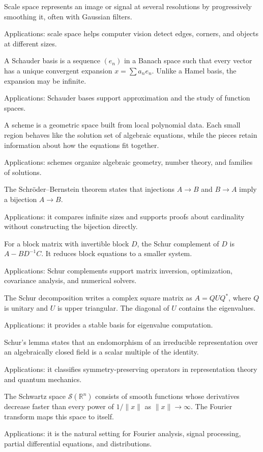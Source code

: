 Scale space represents an image or signal at several resolutions by progressively smoothing it, often with Gaussian filters. \par\noindent Applications: scale space helps computer vision detect edges, corners, and objects at different sizes.

A Schauder basis is a sequence $(e_n)$ in a Banach space such that every vector has a unique convergent expansion $x=\sum a_ne_n$. Unlike a Hamel basis, the expansion may be infinite. \par\noindent Applications: Schauder bases support approximation and the study of function spaces.

A scheme is a geometric space built from local polynomial data. Each small region behaves like the solution set of algebraic equations, while the pieces retain information about how the equations fit together. \par\noindent Applications: schemes organize algebraic geometry, number theory, and families of solutions.

The Schröder--Bernstein theorem states that injections $A\to B$ and $B\to A$ imply a bijection $A\to B$. \par\noindent Applications: it compares infinite sizes and supports proofs about cardinality without constructing the bijection directly.

For a block matrix with invertible block $D$, the Schur complement of $D$ is $A-BD^{-1}C$. It reduces block equations to a smaller system. \par\noindent Applications: Schur complements support matrix inversion, optimization, covariance analysis, and numerical solvers.

The Schur decomposition writes a complex square matrix as $A=QUQ^*$, where $Q$ is unitary and $U$ is upper triangular. The diagonal of $U$ contains the eigenvalues. \par\noindent Applications: it provides a stable basis for eigenvalue computation.

Schur's lemma states that an endomorphism of an irreducible representation over an algebraically closed field is a scalar multiple of the identity. \par\noindent Applications: it classifies symmetry-preserving operators in representation theory and quantum mechanics.

The Schwartz space $\mathcal{S}(\mathbb{R}^n)$ consists of smooth functions whose derivatives decrease faster than every power of $1/\lVert x\rVert$ as $\lVert x\rVert\to\infty$. The Fourier transform maps this space to itself. \par\noindent Applications: it is the natural setting for Fourier analysis, signal processing, partial differential equations, and distributions.

